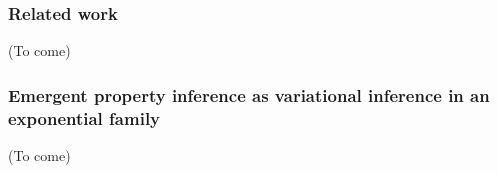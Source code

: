 \documentclass[11pt]{article}
\DeclareMathOperator*{\argmin}{argmin}
\begin{document}
\subsubsection{Related work}\label{methods_related_work}
(To come)\\


\subsubsection{Emergent property inference as variational inference in an exponential family}\label{methods_VI}
(To come) \\
\end{document}
